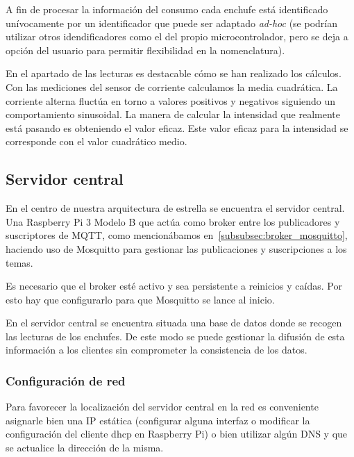 \documentclass[a4paper,10pt]{article}
\begin{document}
A fin de procesar la información del consumo cada enchufe está
identificado unívocamente por un identificador que puede ser adaptado
\textit{ad-hoc} (se podrían utilizar otros idendificadores como el del propio
microcontrolador, pero se deja a opción del usuario para permitir
flexibilidad en la nomenclatura).

En el apartado de las lecturas es destacable cómo se han realizado los
cálculos. Con las mediciones del sensor de corriente calculamos la
media cuadrática. La corriente alterna fluctúa en torno a valores
positivos y negativos siguiendo un comportamiento sinusoidal. La
manera de calcular la intensidad que realmente está pasando es
obteniendo el valor eficaz. Este valor eficaz para la intensidad se
corresponde con el valor cuadrático
medio\cite{alcaldesanmiguelElectrotecniaInstalacionesElectricas2014}.



\newpage

\subsection{Servidor central}\label{subsec:servidor-central}

En el centro de nuestra arquitectura de estrella se encuentra el
servidor central. Una Raspberry Pi 3 Modelo B que actúa como broker
entre los publicadores y suscriptores de MQTT, como mencionábamos
en~\ref{subsubsec:broker_mosquitto}, haciendo uso de Mosquitto para
gestionar las publicaciones y suscripciones a los temas.

Es necesario que el broker esté activo y sea persistente a reinicios y
caídas. Por esto hay que configurarlo para que Mosquitto se lance al
inicio.

En el servidor central se encuentra situada una base de datos donde se
recogen las lecturas de los enchufes. De este modo se puede gestionar
la difusión de esta información a los clientes sin comprometer la
consistencia de los datos.

\subsubsection{Configuración de red}

Para favorecer la localización del servidor central en la red es
conveniente asignarle bien una IP estática (configurar alguna interfaz
o modificar la configuración del cliente dhcp en Raspberry Pi) o bien
utilizar algún DNS y que se actualice la dirección de la misma.
\end{document}
